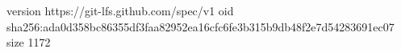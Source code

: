 version https://git-lfs.github.com/spec/v1
oid sha256:ada0d358bc86355df3faa82952ea16cfc6fe3b315b9db48f2e7d54283691ec07
size 1172
